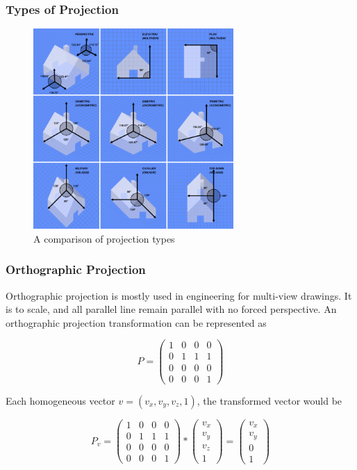 \documentclass{article}
\begin{document}
\subsubsection{Types of Projection}

\begin{figure}
    \centering
    \includegraphics[width=3.0in]{Graphical_projection_comparison.png}
    \caption{A comparison of projection types}
    \label{projectiontypes}
\end{figure}

\subsubsection{Orthographic Projection}
Orthographic projection is mostly used in engineering for multi-view drawings. It is to scale, and all parallel line remain parallel with no forced perspective. An orthographic projection transformation can be represented as

\[ P = \begin{pmatrix}
  1 & 0 & 0 & 0 \\
  0 & 1 & 1 & 1 \\
  0 & 0 & 0 & 0 \\
  0 & 0 & 0 & 1 
 \end{pmatrix}\]	

Each homogeneous vector $v = (v_x, v_y, v_z, 1)$, the transformed vector would be

\[P_{v} = \begin{pmatrix}
  1 & 0 & 0 & 0 \\
  0 & 1 & 1 & 1 \\
  0 & 0 & 0 & 0 \\
  0 & 0 & 0 & 1 
 \end{pmatrix}	
*
\begin{pmatrix}
  v_{x} \\
  v_{y} \\
  v_{z} \\
  1
 \end{pmatrix}	
=
\begin{pmatrix}
  v_{x} \\
  v_{y} \\
  0 \\
  1
 \end{pmatrix}\]
\end{document}
